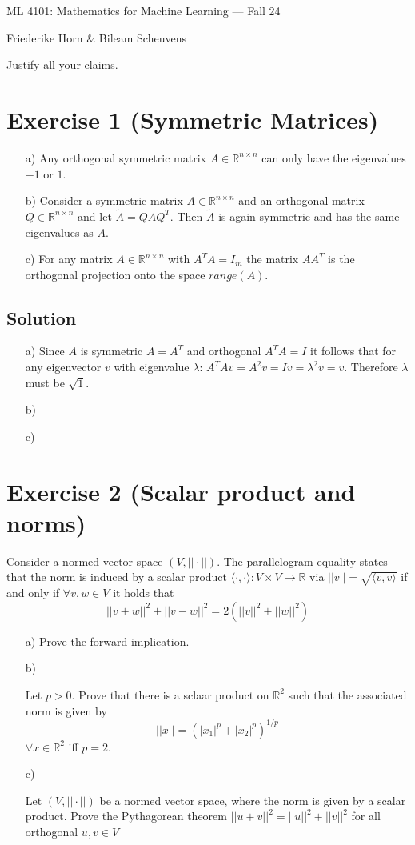 \documentclass[10pt]{article}
\numberwithin{equation}{section}
\begin{document}
\begin{center}
    \sc ML 4101: Mathematics for Machine Learning --- Fall 24
\end{center}

\noindent Friederike Horn \& Bileam Scheuvens

Justify all your claims.
\section*{Exercise 1 (Symmetric Matrices)}
\begin{enumerate}
\item[a)]{
    Any orthogonal symmetric matrix $A \in \mathbb{R}^{n\times n}$ can only have the eigenvalues $-1$ or $1$.
  }
\item[b)]{
    Consider a symmetric matrix $A \in \mathbb{R}^{n\times n}$ and an orthogonal matrix $Q \in \mathbb{R}^{n\times n}$ and let $\tilde{A} = QAQ^T$. Then $\tilde{A}$ is again symmetric and has the same eigenvalues as $A$.
  }
\item[c)]{
    For any matrix $A \in \mathbb{R}^{n\times n}$ with $A^TA = I_m$ the matrix $AA^T$ is the orthogonal projection onto the space $range(A)$.
  }
\end{enumerate}
\subsection*{Solution}
\begin{enumerate}
\item[a)]{
    Since $A$ is symmetric $A = A^T$ and orthogonal $A^T A = I$ it follows that for any eigenvector $v$ with eigenvalue $\lambda$: $A^T Av = A^2v = Iv = \lambda^2v = v$. Therefore $\lambda$ must be $\sqrt{1}$.
  }
\item[b)]{
  }
\item[c)]{
  }
\end{enumerate}

\section*{Exercise 2 (Scalar product and norms)}
Consider a normed vector space $(V, ||\cdot||)$. The parallelogram equality states that the norm is induced by a scalar product $\langle \cdot, \cdot \rangle: V \times V \rightarrow \mathbb{R}$ via $||v|| = \sqrt{\langle v, v \rangle}$ if and only if $\forall v, w \in V$ it holds that
$$ || v + w||^2 + ||v - w||^2 = 2(||v||^2 + ||w||^2)$$

\begin{enumerate}
\item[a)]{
    Prove the forward implication.
  }
\item[b)]{
    Let $p > 0$. Prove that there is a sclaar product on $\mathbb{R}^2$ such that the associated norm is given by 
$$||x|| = (|x_1|^p + |x_2|^p)^{1/p}$$
$\forall x \in \mathbb{R}^2$ iff $p =2$.

  }
\item[c)]{
    Let $(V, ||\cdot||)$ be a normed vector space, where the norm is given by a scalar product. Prove the Pythagorean theorem $||u + v||^2 = ||u||^2 + ||v||^2$ for all orthogonal $u,v \in V$

  }
\end{enumerate}
\end{document}
